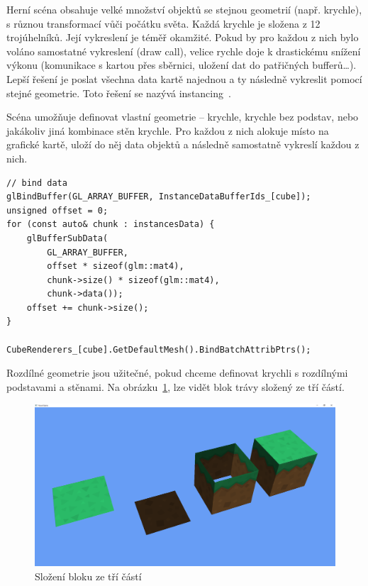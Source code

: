 \documentclass[thesis=M,czech]{FITthesis}[2019/12/23]
\begin{document}
Herní scéna obsahuje velké množství objektů se stejnou geometrií (např. krychle), s různou transformací vůči počátku světa. Každá krychle je složena z 12 trojúhelníků. Její vykreslení je téměř okamžité. Pokud by pro každou z nich bylo voláno samostatné vykreslení (draw call), velice rychle doje k drastickému snížení výkonu (komunikace s kartou přes sběrnici, uložení dat do patřičných bufferů\dots). Lepší řešení je poslat všechna data kartě najednou a ty následně vykreslit pomocí stejné geometrie. Toto řešení se nazývá instancing~\cite{lopgl_instancing}.

Scéna umožňuje definovat vlastní geometrie -- krychle, krychle bez podstav, nebo jakákoliv jiná kombinace stěn krychle. Pro každou z nich alokuje místo na grafické kartě, uloží do něj data objektů a následně samostatně vykreslí každou z nich.

\begin{verbatim}
// bind data
glBindBuffer(GL_ARRAY_BUFFER, InstanceDataBufferIds_[cube]);
unsigned offset = 0;
for (const auto& chunk : instancesData) {
    glBufferSubData(
        GL_ARRAY_BUFFER,
        offset * sizeof(glm::mat4), 
        chunk->size() * sizeof(glm::mat4), 
        chunk->data());
    offset += chunk->size();
}

CubeRenderers_[cube].GetDefaultMesh().BindBatchAttribPtrs();
\end{verbatim}

Rozdílné geometrie jsou užitečné, pokud chceme definovat krychli s rozdílnými podstavami a stěnami. Na obrázku~\ref{fig:block_composition}, lze vidět blok trávy složený ze tří částí.

\begin{figure}\centering
	\includegraphics[width=\textwidth]{images/block_composition}
	\caption[Složení bloku ze tří částí]{Složení bloku ze tří částí}\label{fig:block_composition}
\end{figure}
\end{document}
